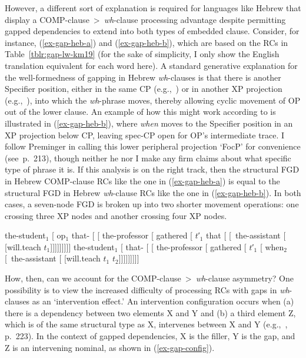 However, a different sort of explanation is required for languages like Hebrew that display a COMP-clause~>~\textit{wh}-clause processing advantage despite permitting gapped dependencies to extend into both types of embedded clause. Consider, for instance, (\ref{ex-gap-heb-a}) and (\ref{ex-gap-heb-b}), which are based on the RCs in Table~\ref{tblr:gap-lw-km19} (for the sake of simplicity, I only show the English translation equivalent for each word here). A standard generative explanation for the well-formedness of gapping in Hebrew \textit{wh}-clauses is that there is another Specifier position, either in the same CP (e.g.,~\cite{sabel2002}) or in another XP projection (e.g.,~\cite{preminger2010}), into which the \textit{wh}-phrase moves, thereby allowing cyclic movement of OP out of the lower clause. An example of how this might work according to \textcite{preminger2010} is illustrated in (\ref{ex-gap-heb-b}), where \textit{when} moves to the Specifier position in an XP projection below CP, leaving spec-CP open for OP's intermediate trace. I follow Preminger in calling this lower peripheral projection `FocP' for convenience (see~p.~213), though neither he nor I make any firm claims about what specific type of phrase it is. If this analysis is on the right track, then the structural FGD in Hebrew COMP-clause RCs like the one in (\ref{ex-gap-heb-a}) is equal to the structural FGD in Hebrew \textit{wh}-clause RCs like the one in (\ref{ex-gap-heb-b}). In both cases, a seven-node FGD is broken up into two shorter movement operations: one crossing three XP nodes and another crossing four XP nodes.

\pex 
\a the-student$_1$ [ {\sc op}$_1$ that- [ [ the-professor [ gathered [ $t$′$_1$ that [ [~the-assistant [ [will.teach $t_1$]]]]]]]]]\label{ex-gap-heb-a}
\a the-student$_1$ [ that- [ [ the-professor [ gathered [ $t$′$_1$ [ when$_2$ [~the-assistant [ [will.teach $t_1$ $t_2$]]]]]]]]]\label{ex-gap-heb-b}
\xe 

How, then, can we account for the COMP-clause~>~\textit{wh}-clause asymmetry? One possibility is to view the increased difficulty of processing RCs with gaps in \textit{wh}-clauses as an `intervention effect.' An intervention configuration occurs when (a) there is a dependency between two elements X and Y and (b) a third element Z, which is of the same structural type as X, intervenes between X and Y (e.g.,~\cite{rizzi2004}, p.~223). In the context of gapped dependencies, X is the filler, Y is the gap, and Z is an intervening nominal, as shown in (\ref{ex-gap-config}).

